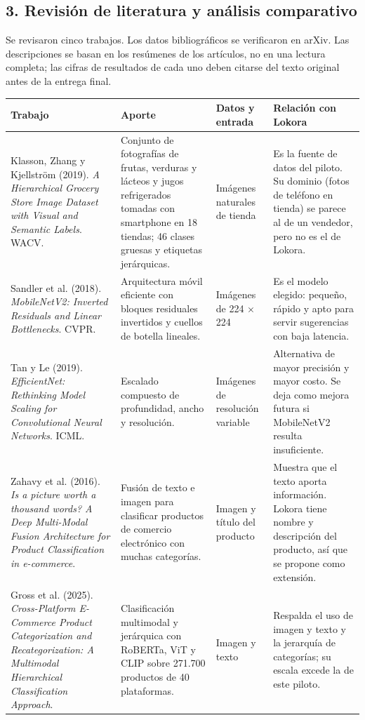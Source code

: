 \documentclass[11pt,a4paper]{article}
\begin{document}
\subsection*{3. Revisión de literatura y análisis comparativo}
\noindent Se revisaron cinco trabajos. Los datos bibliográficos se verificaron en arXiv. Las descripciones se basan en los resúmenes de los artículos, no en una lectura completa; las cifras de resultados de cada uno deben citarse del texto original antes de la entrega final.\par
\begin{center}\small
\begin{tabularx}{\textwidth}{XXXX}
\toprule
\textbf{Trabajo} & \textbf{Aporte} & \textbf{Datos y entrada} & \textbf{Relación con Lokora} \\
\midrule
Klasson, Zhang y Kjellström (2019). \emph{A Hierarchical Grocery Store Image Dataset with Visual and Semantic Labels}. WACV. & Conjunto de fotografías de frutas, verduras y lácteos y jugos refrigerados tomadas con smartphone en 18 tiendas; 46 clases gruesas y etiquetas jerárquicas. & Imágenes naturales de tienda & Es la fuente de datos del piloto. Su dominio (fotos de teléfono en tienda) se parece al de un vendedor, pero no es el de Lokora. \\
Sandler et al. (2018). \emph{MobileNetV2: Inverted Residuals and Linear Bottlenecks}. CVPR. & Arquitectura móvil eficiente con bloques residuales invertidos y cuellos de botella lineales. & Imágenes de 224 $\times$ 224 & Es el modelo elegido: pequeño, rápido y apto para servir sugerencias con baja latencia. \\
Tan y Le (2019). \emph{EfficientNet: Rethinking Model Scaling for Convolutional Neural Networks}. ICML. & Escalado compuesto de profundidad, ancho y resolución. & Imágenes de resolución variable & Alternativa de mayor precisión y mayor costo. Se deja como mejora futura si MobileNetV2 resulta insuficiente. \\
Zahavy et al. (2016). \emph{Is a picture worth a thousand words? A Deep Multi-Modal Fusion Architecture for Product Classification in e-commerce}. & Fusión de texto e imagen para clasificar productos de comercio electrónico con muchas categorías. & Imagen y título del producto & Muestra que el texto aporta información. Lokora tiene nombre y descripción del producto, así que se propone como extensión. \\
Gross et al. (2025). \emph{Cross-Platform E-Commerce Product Categorization and Recategorization: A Multimodal Hierarchical Classification Approach}. & Clasificación multimodal y jerárquica con RoBERTa, ViT y CLIP sobre 271.700 productos de 40 plataformas. & Imagen y texto & Respalda el uso de imagen y texto y la jerarquía de categorías; su escala excede la de este piloto. \\
\bottomrule
\end{tabularx}
\end{center}
\end{document}
